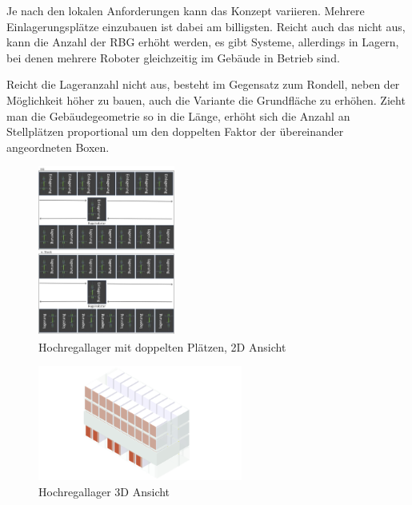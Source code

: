 \clearpage

\noindent Je nach den lokalen Anforderungen kann das Konzept variieren. Mehrere Einlagerungsplätze einzubauen ist dabei am billigsten. Reicht auch das nicht aus, kann die Anzahl der \ac{RBG} erhöht werden, es gibt Systeme, allerdings in Lagern, bei denen mehrere Roboter gleichzeitig im Gebäude in Betrieb sind.

\noindent Reicht die Lageranzahl nicht aus, besteht im Gegensatz zum Rondell, neben der Möglichkeit höher zu bauen, auch die Variante die Grundfläche zu erhöhen. Zieht man die Gebäudegeometrie so in die Länge, erhöht sich die Anzahl an Stellplätzen proportional um den doppelten Faktor der übereinander angeordneten Boxen.

\begin{figure}[H]
    \centering
    \includegraphics[width=0.4\textwidth]{images/hochregallager2ddoppelt.jpg}
    \caption{Hochregallager mit doppelten Plätzen, 2D Ansicht}
    \label{fig:hochregallager2ddoppelt}
\end{figure}

\begin{figure}[H]
    \centering
    \includegraphics[width=0.6\textwidth]{images/hochregallager3d.png}
    \caption{Hochregallager 3D Ansicht}
    \label{fig:hochregallager3d}
\end{figure}

